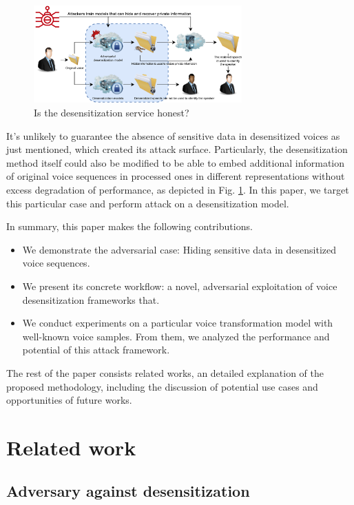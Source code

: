 \documentclass[journal]{IEEEtran} %
\begin{document}
\begin{CJK*}{UTF8}{gbsn}
\begin{figure}[htbp]
    \centerline{\includegraphics[width=8cm]{adversary.png}}
    \caption{Is the desensitization service honest?}
    \label{case4}
\end{figure}

It's unlikely to guarantee the absence of sensitive data in desensitized voices as just mentioned, which created its attack surface. Particularly, the desensitization method itself could also be modified to be able to embed additional information of original voice sequences in processed ones in different representations without excess degradation of performance\cite{a1}, as depicted in Fig. \ref{case4}. In this paper, we target this particular case and perform attack on a desensitization model.

In summary, this paper makes the following contributions.

\begin{itemize}

\item We demonstrate the adversarial case: Hiding sensitive data in desensitized voice sequences.

\item We present its concrete workflow: a novel, adversarial exploitation of voice desensitization frameworks that.

\item We conduct experiments on a particular voice transformation model with well-known voice samples. From them, we analyzed the performance and potential of this attack framework.

\end{itemize}
The rest of the paper consists related works, an detailed explanation of the proposed methodology, including the discussion of potential use cases and opportunities of future works.

\section{Related work}

\subsection{Adversary against desensitization}


\end{CJK*}
\end{document}
